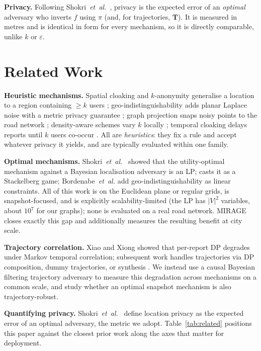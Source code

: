 \documentclass[10pt,journal,compsoc]{IEEEtran}
\begin{document}
\textbf{Privacy.} Following Shokri~\emph{et~al.}~\cite{shokri2011}, privacy is the
expected error of an \emph{optimal} adversary who inverts $f$ using $\pi$ (and, for
trajectories, $\mathbf{T}$). It is measured in metres and is identical in form for
every mechanism, so it is directly comparable, unlike $k$ or $\varepsilon$.

\section{Related Work}
\label{sec:related}
\textbf{Heuristic mechanisms.} Spatial cloaking and $k$-anonymity generalise a
location to a region containing $\ge k$ users \cite{sweeney2002,gruteser2003,
mokbel2006,duckham2005}; geo-indistinguishability adds planar Laplace noise with a
metric privacy guarantee \cite{andres2013,chatzikokolakis2013}; graph projection
snaps noisy points to the road network \cite{bordenabe2014}; density-aware schemes
vary $k$ locally \cite{niu2014}; temporal cloaking delays reports until $k$ users
co-occur \cite{gruteser2003}. All are \emph{heuristics}: they fix a rule and accept
whatever privacy it yields, and are typically evaluated within one family.

\textbf{Optimal mechanisms.} Shokri~\emph{et~al.}~\cite{shokri2012} showed that the
utility-optimal mechanism against a Bayesian localisation adversary is an LP;
\cite{shokri2015pets} casts it as a Stackelberg game; Bordenabe~\emph{et~al.}
\cite{bordenabe2014} add geo-indistinguishability as linear constraints. All of
this work is on the Euclidean plane or regular grids, is snapshot-focused, and is
explicitly scalability-limited (the LP has $|V|^2$ variables, about $10^7$ for our
graphs); none is evaluated on a real road network. MIRAGE closes exactly this gap
and additionally measures the resulting benefit at city scale.

\textbf{Trajectory correlation.} Xiao and Xiong \cite{xiao2015} showed that
per-report DP degrades under Markov temporal correlation; subsequent work handles
trajectories via DP composition, dummy trajectories, or synthesis
\cite{du2023,hu2024,buchholz2024}. We instead use a causal Bayesian filtering
trajectory adversary to measure this degradation across mechanisms on a common
scale, and study whether an optimal snapshot mechanism is also trajectory-robust.

\textbf{Quantifying privacy.} Shokri~\emph{et~al.}~\cite{shokri2011} define
location privacy as the expected error of an optimal adversary, the metric we
adopt. Table~\ref{tab:related} positions this paper against the closest prior work
along the axes that matter for deployment.
\end{document}
